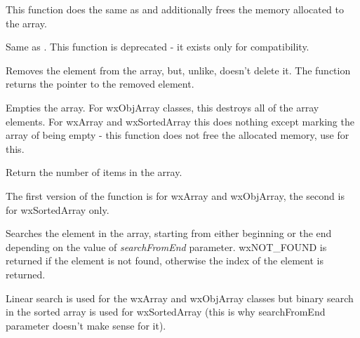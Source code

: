 \label{wxarrayclear}


This function does the same as  and additionally
frees the memory allocated to the array.

\label{wxarraycount}


Same as . This function is deprecated -
it exists only for compatibility.

\label{wxobjarraydetach}


Removes the element from the array, but, unlike, 
 doesn't delete it. The function returns the
pointer to the removed element.

\label{wxarrayempty}


Empties the array. For wxObjArray classes, this destroys all of the array
elements. For wxArray and wxSortedArray this does nothing except marking the
array of being empty - this function does not free the allocated memory, use 
 for this.

\label{wxarraygetcount}


Return the number of items in the array.

\label{wxarrayindex}



The first version of the function is for wxArray and wxObjArray, the second is
for wxSortedArray only.

Searches the element in the array, starting from either beginning or the end
depending on the value of {\it searchFromEnd} parameter. wxNOT\_FOUND is
returned if the element is not found, otherwise the index of the element is
returned.

Linear search is used for the wxArray and wxObjArray classes but binary search
in the sorted array is used for wxSortedArray (this is why searchFromEnd
parameter doesn't make sense for it).

